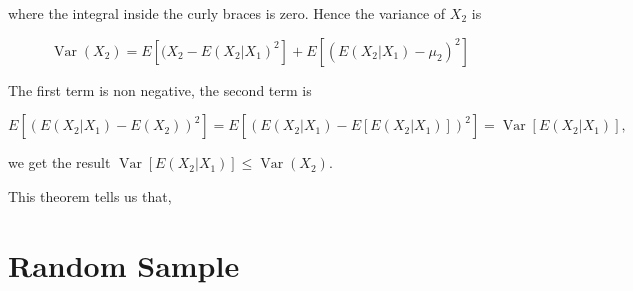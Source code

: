\documentclass{article}
\begin{document}
                    where the integral inside the curly braces is zero. Hence the variance of $ X_{2} $ is

                    \begin{equation*}
                         \operatorname{Var}(X_{2}) = E \left[ (X_{2} -
                             E(X_{2}|X_{1})^2 \right] + E \left[ (E(X_{2}|X_{1}) -
                     \mu_{2})^2 \right]
                    \end{equation*}

                    The first term is non negative, the second term is

                    \begin{equation*}
                        E\left[ (E(X_{2} | X_{1}) - E(X_{2}))^{2} \right] 
                            = E\left[ (E(X_{2} | X_{1}) - E[ E(X_{2} | X_{1}) ])^{2} \right]
                            = \operatorname{Var} \left[ E(X_{2} | X_{1}) \right],
                    \end{equation*}

                    we get the result $ \operatorname{Var}[E(X_{2}|X_{1})] \leq \operatorname{Var}(X_{2}) $.

                    This theorem tells us that,

    \section{Random Sample}
\end{document}
